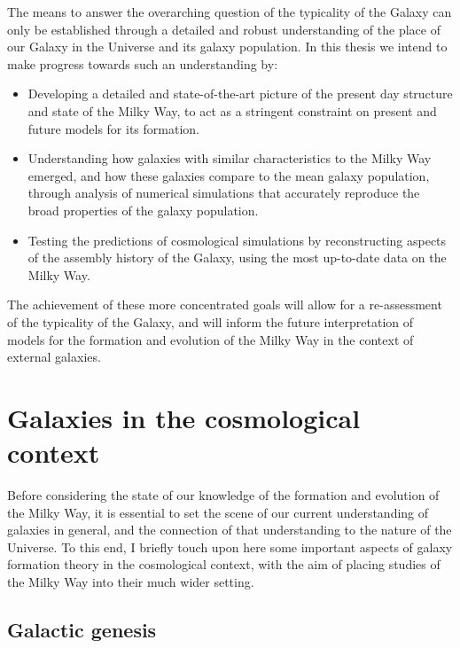 The means to answer the overarching question of the typicality of the Galaxy can only be established through a detailed and robust understanding of the place of our Galaxy in the Universe and its galaxy population. In this thesis we intend to make progress towards such an understanding by:
\begin{itemize}
    \item Developing a detailed and state-of-the-art picture of the present day structure and state of the Milky Way, to act as a stringent constraint on present and future models for its formation.
    \item Understanding how galaxies with similar characteristics to the Milky Way emerged, and how these galaxies compare to the mean galaxy population, through analysis of numerical simulations that accurately reproduce the broad properties of the galaxy population.
    \item Testing the predictions of cosmological simulations by reconstructing aspects of the assembly history of the Galaxy, using the most up-to-date data on the Milky Way.
\end{itemize}
The achievement of these more concentrated goals will allow for a re-assessment of the typicality of the Galaxy, and will inform the future interpretation of models for the formation and evolution of the Milky Way in the context of external galaxies.

\section{Galaxies in the cosmological context}

Before considering the state of our knowledge of the formation and evolution of the Milky Way, it is essential to set the scene of our current understanding of galaxies in general, and the connection of that understanding to the nature of the Universe. To this end, I briefly touch upon here some important aspects of galaxy formation theory in the cosmological context, with the aim of placing studies of the Milky Way into their much wider setting.

\subsection{Galactic genesis}

